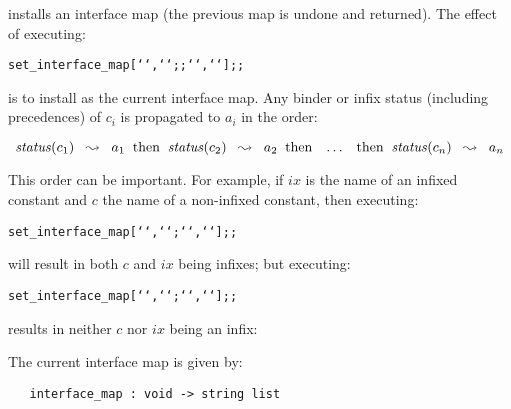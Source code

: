 \noindent installs an interface map (the previous map is undone and returned).
The effect of executing:

\begin{hol}\begin{alltt}
   set_interface_map [``,``; \m{\ldots} ;``,``];;
\end{alltt}\end{hol}

\noindent is to install
\ml{[`\m{a_1}`,`\m{c_1}`;\m{\ \ldots\ } ;`\m{a_n}`,`\m{c_n}`]}
as the current interface map.  Any
binder or infix status (including precedences) of $c_i$ is propagated
to $a_i$ in the order:


\[ {\it status\/}(c_1)\;\;\leadsto\;\; a_1\;\; {\rm then}\;\;
   {\it status\/}(c_2)\;\;\leadsto\;\; a_2\;\; {\rm then}\;\;\;
    \ldots\;\;\;{\rm then}\;\; {\it status\/}(c_n)\;\;\leadsto\;\;a_n \]



\noindent This order can be important. For example, if $ix$ is the
name of an
infixed constant and $c$ the name of a non-infixed
constant, then executing:

{\def\con#1{\mbox{\normalsize\sf #1}}
\begin{hol}\begin{alltt}
   set\_interface\_map[``,``; ``,``];;
\end{alltt}\end{hol}}


\noindent will result in both $c$ and $ix$ being infixes; but
executing:

{\def\con#1{\mbox{\normalsize\sf #1}}
\begin{hol}\begin{alltt}
   set\_interface\_map[``,``; ``,``];;
\end{alltt}\end{hol}}


\noindent results in neither $c$ nor $ix$ being an infix:

The current interface map is given by:


\begin{boxed}
\begin{verbatim}
   interface_map : void -> string list
\end{verbatim}\end{boxed}

